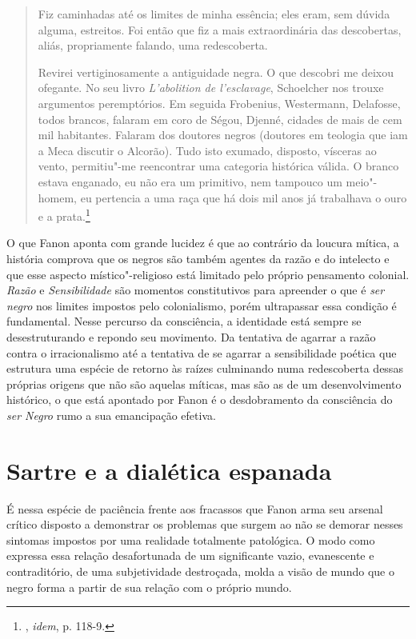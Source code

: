 \begin{quote}
Fiz caminhadas até os limites de minha essência; eles eram, sem dúvida
alguma, estreitos. Foi então que fiz a mais extraordinária das
descobertas, aliás, propriamente falando, uma redescoberta.

Revirei vertiginosamente a antiguidade negra. O que descobri me deixou
ofegante. No seu livro \emph{L'abolition de l'esclavage}, Schoelcher nos
trouxe argumentos peremptórios. Em seguida Frobenius, Westermann,
Delafosse, todos brancos, falaram em coro de Ségou, Djenné, cidades de
mais de cem mil habitantes. Falaram dos doutores negros (doutores em
teologia que iam a Meca discutir o Alcorão). Tudo isto exumado,
disposto, vísceras ao vento, permitiu"-me reencontrar uma categoria
histórica válida. O branco estava enganado, eu não era um primitivo, nem
tampouco um meio"-homem, eu pertencia a uma raça que há dois mil anos já
trabalhava o ouro e a prata.\footnote{, \emph{idem}, p. 118-9.}
\end{quote}

O que Fanon aponta com grande lucidez é que ao contrário da loucura
mítica, a história comprova que os negros são também agentes da razão e
do intelecto e que esse aspecto místico"-religioso está limitado pelo
próprio pensamento colonial. \emph{Razão} e \emph{Sensibilidade} são
momentos constitutivos para apreender o que é \emph{ser negro} nos
limites impostos pelo colonialismo, porém ultrapassar essa condição é
fundamental. Nesse percurso da consciência, a identidade está sempre se
desestruturando e repondo seu movimento. Da tentativa de agarrar a razão
contra o irracionalismo até a tentativa de se agarrar a sensibilidade
poética que estrutura uma espécie de retorno às raízes culminando numa
redescoberta dessas próprias origens que não são aquelas míticas, mas
são as de um desenvolvimento histórico, o que está apontado por Fanon é
o desdobramento da consciência do \emph{ser Negro} rumo a sua
emancipação efetiva.

\chapter{Sartre e a dialética espanada}

É nessa espécie de paciência frente aos fracassos que Fanon arma seu
arsenal crítico disposto a demonstrar os problemas que surgem ao não se
demorar nesses sintomas impostos por uma realidade totalmente
patológica. O modo como expressa essa relação desafortunada de um
significante vazio, evanescente e contraditório, de uma subjetividade
destroçada, molda a visão de mundo que o negro forma a partir de sua
relação com o próprio mundo.

